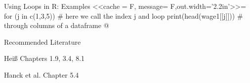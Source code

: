 \documentclass[11pt, aspectratio = 169]{beamer}
\begin{document}
\begin{frame}[fragile]{Using Loops in R: Examples}  \small
<<cache = F, message= F,out.width='2.2in'>>=
for (j in c(1,3,5)) {               # here we call the index j and loop
    print(head(wage1[[j]]))          # through columns of a dataframe
}
@ 
\end{frame}



\begin{frame}{Recommended Literature}

Heiß Chapters 1.9, 3.4, 8.1

Hanck et al. Chapter 5.4
   
\end{frame}
\end{document}
